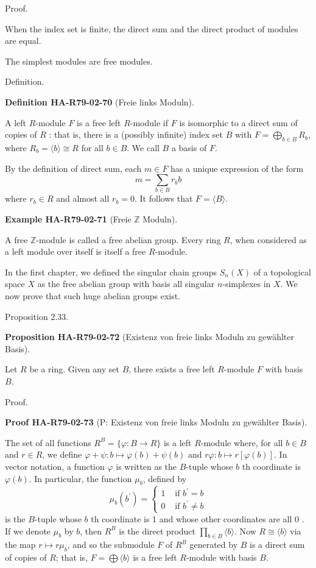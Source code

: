 \documentclass[10pt, letterpaper]{article}
\newcommand{\Z}{\mathbb{Z}}
\newcommand{\CustomHeading}[3]{%
  \par\medskip\noindent%
  \textbf{#1 #2} \textnormal{(#3)}.\enskip%
}
\newenvironment{DEF}[2]{\begin{unitbox}\CustomHeading{Definition}{#1}{#2}}{\end{unitbox}}
\newenvironment{PROP}[2]{\begin{unitbox}\CustomHeading{Proposition}{#1}{#2}}{\end{unitbox}}
\newenvironment{EXA}[2]{\begin{unitbox}\CustomHeading{Example}{#1}{#2}}{\end{unitbox}}
\newenvironment{PROOF}[2]{\begin{unitbox}\CustomHeading{Proof}{#1}{#2}}{\end{unitbox}}
\begin{document}
Proof. 

When the index set is finite, the direct sum and the direct product of modules are equal.

The simplest modules are free modules.



Definition. 


\begin{DEF}{HA-R79-02-70}{Freie links Moduln}
A left $R$-module $F$ is a free left $R$-module if $F$ is isomorphic to a direct sum of copies of $R$ : that is, there is a (possibly infinite) index set $B$ with $F=\bigoplus_{b \in B} R_{b}$, where $R_{b}=\langle b\rangle \cong R$ for all $b \in B$. We call $B$ a basis of $F$.

By the definition of direct sum, each $m \in F$ has a unique expression of the form
$$
m=\sum_{b \in B} r_{b} b
$$
where $r_{b} \in R$ and almost all $r_{b}=0$. It follows that $F=\langle B\rangle$.
\end{DEF}

\begin{EXA}{HA-R79-02-71}{Freie $\Z$ Moduln}
A free $\mathbb{Z}$-module is called a free abelian group. Every ring $R$, when considered as a left module over itself is itself a free $R$-module.
\end{EXA}


In the first chapter, we defined the singular chain groups $S_{n}(X)$ of a topological space $X$ as the free abelian group with basis all singular $n$-simplexes in $X$. We now prove that such huge abelian groups exist.



Proposition 2.33. 


\begin{PROP}{HA-R79-02-72}{Existenz von freie links Moduln zu gewählter Basis}
Let $R$ be a ring. Given any set $B$, there exists a free left $R$-module $F$ with basis $B$.
\end{PROP}

Proof. 

\begin{PROOF}{HA-R79-02-73}{P: Existenz von freie links Moduln zu gewählter Basis}
The set of all functions $R^{B}=\{\varphi: B \rightarrow R\}$ is a left $R$-module where, for all $b \in B$ and $r \in R$, we define $\varphi+\psi: b \mapsto \varphi(b)+\psi(b)$ and $r \varphi: b \mapsto r[\varphi(b)]$. In vector notation, a function $\varphi$ is written as the $B$-tuple whose $b$ th coordinate is $\varphi(b)$. In particular, the function $\mu_{b}$, defined by
$$
\mu_{b}\left(b^{\prime}\right)= \begin{cases}1 & \text { if } b^{\prime}=b \\ 0 & \text { if } b^{\prime} \neq b\end{cases}
$$
is the $B$-tuple whose $b$ th coordinate is 1 and whose other coordinates are all 0 . If we denote $\mu_{b}$ by $b$, then $R^{B}$ is the direct product $\prod_{b \in B}\langle b\rangle$. Now $R \cong\langle b\rangle$ via the map $r \mapsto r \mu_{b}$, and so the submodule $F$ of $R^{B}$ generated by $B$ is a direct sum of copies of $R$; that is, $F=\bigoplus\langle b\rangle$ is a free left $R$-module with basis $B$.
\end{PROOF}
\end{document}

